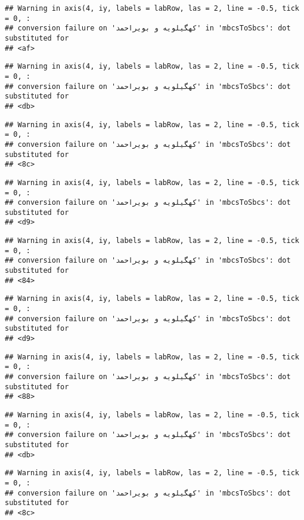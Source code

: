\documentclass[
]{article}
\begin{document}
\begin{verbatim}
## Warning in axis(4, iy, labels = labRow, las = 2, line = -0.5, tick = 0, :
## conversion failure on 'کهگیلویه و بویراحمد' in 'mbcsToSbcs': dot substituted for
## <af>
\end{verbatim}

\begin{verbatim}
## Warning in axis(4, iy, labels = labRow, las = 2, line = -0.5, tick = 0, :
## conversion failure on 'کهگیلویه و بویراحمد' in 'mbcsToSbcs': dot substituted for
## <db>
\end{verbatim}

\begin{verbatim}
## Warning in axis(4, iy, labels = labRow, las = 2, line = -0.5, tick = 0, :
## conversion failure on 'کهگیلویه و بویراحمد' in 'mbcsToSbcs': dot substituted for
## <8c>
\end{verbatim}

\begin{verbatim}
## Warning in axis(4, iy, labels = labRow, las = 2, line = -0.5, tick = 0, :
## conversion failure on 'کهگیلویه و بویراحمد' in 'mbcsToSbcs': dot substituted for
## <d9>
\end{verbatim}

\begin{verbatim}
## Warning in axis(4, iy, labels = labRow, las = 2, line = -0.5, tick = 0, :
## conversion failure on 'کهگیلویه و بویراحمد' in 'mbcsToSbcs': dot substituted for
## <84>
\end{verbatim}

\begin{verbatim}
## Warning in axis(4, iy, labels = labRow, las = 2, line = -0.5, tick = 0, :
## conversion failure on 'کهگیلویه و بویراحمد' in 'mbcsToSbcs': dot substituted for
## <d9>
\end{verbatim}

\begin{verbatim}
## Warning in axis(4, iy, labels = labRow, las = 2, line = -0.5, tick = 0, :
## conversion failure on 'کهگیلویه و بویراحمد' in 'mbcsToSbcs': dot substituted for
## <88>
\end{verbatim}

\begin{verbatim}
## Warning in axis(4, iy, labels = labRow, las = 2, line = -0.5, tick = 0, :
## conversion failure on 'کهگیلویه و بویراحمد' in 'mbcsToSbcs': dot substituted for
## <db>
\end{verbatim}

\begin{verbatim}
## Warning in axis(4, iy, labels = labRow, las = 2, line = -0.5, tick = 0, :
## conversion failure on 'کهگیلویه و بویراحمد' in 'mbcsToSbcs': dot substituted for
## <8c>
\end{verbatim}
\end{document}
